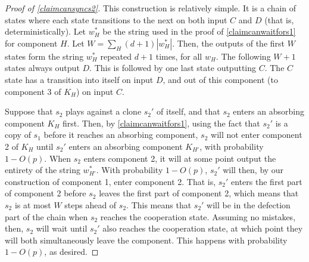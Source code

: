 \documentclass[11pt]{amsart}
\theoremstyle{definition}
\theoremstyle{remark}
\begin{document}
      \begin{proof}[Proof of \cref{claimcansyncs2}]
        This construction is relatively simple. It is a chain of states where each state transitions to the next on both input $C$ and $D$ (that is, deterministically). Let $w_H^*$ be the string used in the proof of \cref{claimcanwaitfors1} for component $H$. Let $W = \sum_{H} (d+1) | w_H^* |$. Then, the outputs of the first $W$ states form the string $w_H^*$ repeated $d+1$ times, for all $w_H$. The following $W+1$ states always output $D$. This is followed by one last state outputting $C$. The $C$ state has a transition into itself on input $D$, and out of this component (to component 3 of $K_H$) on input $C$.

        Suppose that $s_2$ plays against a clone $s_2'$ of itself, and that $s_2$ enters an absorbing component $K_H$ first. Then, by \cref{claimcanwaitfors1}, using the fact that $s_2'$ is a copy of $s_1$ before it reaches an absorbing component, $s_2$ will not enter component 2 of $K_H$ until $s_2'$ enters an absorbing component $K_{H'}$, with probability $1 - O(p)$. When $s_2$ enters component 2, it will at some point output the entirety of the string $w_{H'}^*$. With probability $1 - O(p)$, $s_2'$ will then, by our construction of component 1, enter component 2. That is, $s_2'$ enters the first part of component 2 before $s_2$ leaves the first part of component 2, which means that $s_2$ is at most $W$ steps ahead of $s_2$. This means that $s_2'$ will be in the defection part of the chain when $s_2$ reaches the cooperation state. Assuming no mistakes, then, $s_2$ will wait until $s_2'$ also reaches the cooperation state, at which point they will both simultaneously leave the component. This happens with probability $1 - O(p)$, as desired.
      \end{proof}
\end{document}
